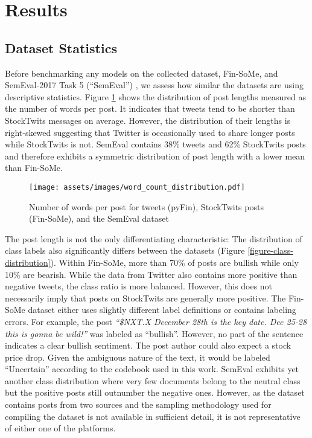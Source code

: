 \section{Results}

\subsection{Dataset Statistics}
\label{section-dataset-diffs}
Before benchmarking any models on the collected dataset, Fin-SoMe, and SemEval-2017 Task 5 (``SemEval'') \cite{cortis2017semeval}, we assess how similar the datasets are using descriptive statistics. Figure \ref{figure-word-counts} shows the distribution of post lengths measured as the number of words per post. It indicates that tweets tend to be shorter than StockTwits messages on average. However, the distribution of their lengths is right-skewed suggesting that Twitter is occasionally used to share longer posts while StockTwits is not. SemEval contains 38\% tweets and 62\% StockTwits posts and therefore exhibits a symmetric distribution of post length with a lower mean than Fin-SoMe.


\begin{figure}[!ht]
	\texttt{[image: assets/images/word\_count\_distribution.pdf]}
	\caption{Number of words per post for tweets (pyFin), StockTwits posts (Fin-SoMe), and the SemEval dataset}
	\label{figure-word-counts}
\end{figure}

The post length is not the only differentiating characteristic: The distribution of class labels also significantly differs between the datasets (Figure \ref{figure-class-distribution}). Within Fin-SoMe, more than 70\% of posts are bullish while only 10\% are bearish. While the data from Twitter also contains more positive than negative tweets, the class ratio is more balanced. However, this does not necessarily imply that posts on StockTwits are generally more positive. The Fin-SoMe dataset either uses slightly different label definitions or contains labeling errors. For example, the post \emph{``\$NXT.X December 28th is the key date. Dec 25-28 this is gonna be wild!''} was labeled as ``bullish''. However, no part of the sentence indicates a clear bullish sentiment. The post author could also expect a stock price drop. Given the ambiguous nature of the text, it would be labeled ``Uncertain'' according to the codebook used in this work. SemEval exhibits yet another class distribution where very few documents belong to the neutral class but the positive posts still outnumber the negative ones. However, as the dataset contains posts from two sources and the sampling methodology used for compiling the dataset is not available in sufficient detail, it is not representative of either one of the platforms.

